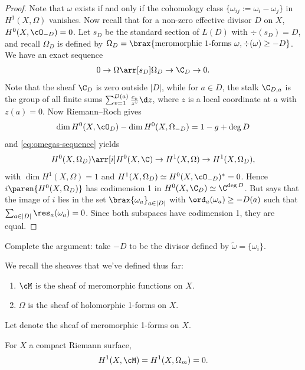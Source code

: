 \documentclass[11pt]{report}
\begin{document}
\begin{proof}
Note that $\omega$ exists if and only if the cohomology class $\{\omega_{ij}:=\omega_i - \omega_j\}$ in $H^1(X,\Omega)$ vanishes. Now recall that for a non-zero effective divisor $D$ on $X$, $H^0(X,\cO_{-D})=0$. Let $s_D$ be the standard section of $L(D)$ with $\div(s_D)=D$, and recall $\Omega _D$ is defined by $\Omega _D=\brax{\text{meromorphic 1-forms }\omega, \div (\omega) \geq -D}$. We have an exact sequence
\begin{align} \label{eq:omegas-sequence}
    0 \to \Omega \arr[s_D]\Omega_D \to \C_D \to 0.
\end{align}
Note that the sheaf $\C_D$ is zero outside $|D|$, while for $a \in D$, the stalk $\C_{D,a}$ is the group of all finite sums $\sum_{v=1}^{D(a)}\frac{c_v}{z^v}\d z$, where $z$ is a local coordinate at $a$ with $z(a)=0$. Now Riemann--Roch gives
\[
\dim H^0(X,\cO_D)-\dim H^0(X,\Omega_{-D})=1-g+\deg D
\]
and \eqref{eq:omegas-sequence} yields
\[
H^0(X,\Omega_D) \arr[i]H^0(X,\C) \to H^1(X,\Omega) \to H^1(X,\Omega_D),
\]
with $\dim H^1(X,\Omega)=1$ and $H^1(X,\Omega_D) \simeq H^0(X,\cO_{-D})^*=0$. Hence $i\paren{H^0(X,\Omega_D)}$ has codimension 1 in $H^0(X,\C_D)\simeq \C^{\deg D}$. But  says that the image of $i$ lies in the set $\brax{\omega_a}_{a \in |D|}$ with $\ord_a(\omega_a)\geq -D(a)$ such that $\sum_{a \in |D|} \res_a(\omega_a)=0$. Since both subspaces have codimension 1, they are equal.
\end{proof}

\begin{exercise}
Complete the argument: take $-D$ to be the divisor defined by $\tilde \omega = \{\omega_i\}$.
\end{exercise}

We recall the sheaves that we've defined thus far:
\begin{enumerate}
    \item $\cM$ is the sheaf of meromorphic functions on $X$.
    \item $\Omega$ is the sheaf of holomorphic 1-forms on $X$.
\end{enumerate}
\begin{defn}
Let  denote the sheaf of meromorphic 1-forms on $X$.
\end{defn}

\begin{cor}
For $X$ a compact Riemann surface,
\begin{align*}
H^1(X,\cM)=H^1(X,\Omega_m)=0.
\end{align*}
\end{cor}
\end{document}
